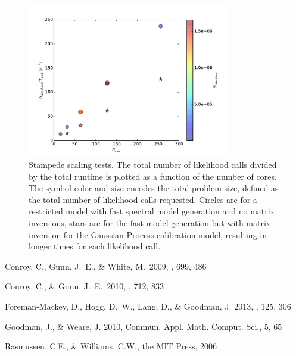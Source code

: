 \documentclass[11pt,preprint]{aastex}
\begin{document}
\begin{figure}
\begin{center}
\includegraphics[width=0.8\textwidth]{efficiency.pdf}
\caption{Stampede scaling tests. The total number of likelihood calls divided by the total runtime is plotted as a function of the number of cores.  The symbol color and size encodes the total problem size, defined as the total number of likelihood calls requested.  Circles are for a restricted model with fast spectral model generation and no matrix inversions, stars are for the fast model generation but with matrix inversion for the Gaussian Process calibration model, resulting in longer times for each likelihood call. \label{fig:scaling}}
\end{center}
\end{figure}
\begin{thebibliography}

Conroy, C., Gunn, J.~E., \& White, M.\ 2009, \apj, 699, 486 

Conroy, C., \& Gunn, J.~E.\ 2010, \apj, 712, 833 

Foreman-Mackey, D., Hogg, D.~W., Lang, D., \& Goodman, J. 2013, \pasp, 125, 306 

Goodman, J., \& Weare,  J. 2010, Commun. Appl. Math. Comput. Sci., 5, 65

Rasmussen, C.E., \& Williams, C.W., the MIT Press, 2006

\end{thebibliography}
\end{document}
